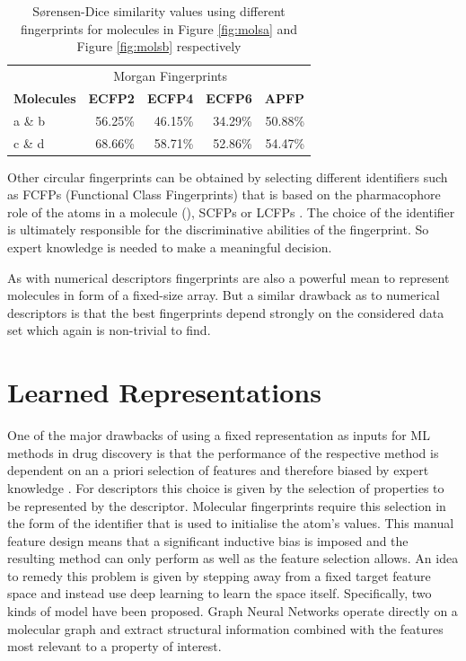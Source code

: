 \begin{table}[h]
	\centering
	\begin{tabularx}{0.57\textwidth}{l
			r
			r 
			r
			r
		}
		\toprule
		& \multicolumn{3}{c}{Morgan Fingerprints} &   \\
		\cmidrule(r){2-4} 
		\bf{Molecules}  &  \multicolumn{1}{c}{\bf{ECFP2}}   & \multicolumn{1}{c}{\bf{ECFP4}}&  \multicolumn{1}{c}{\bf{ECFP6}} & \multicolumn{1}{c}{\bf{APFP}} \\
		\midrule
		a \& b   & 56.25\%   &  46.15\%  & 34.29\%    & 50.88\%   \\
		
		c \& d   & 68.66\%  &  58.71\% &  52.86\%  & 54.47\% \\
		
		
		\bottomrule
	\end{tabularx} 
	
	
	\caption{Sørensen-Dice similarity values \cite{sorensen1948method, dice1945measures} using different fingerprints for molecules in Figure \ref{fig:molsa} and Figure \ref{fig:molsb} respectively}
	\label{tab:dis_metric_2Dshapes}
\end{table}


Other circular fingerprints can be obtained by selecting different identifiers such as FCFPs (Functional Class Fingerprints) that is based on the pharmacophore role of the atoms in a molecule (\cite{ECFP}), SCFPs \citep{SCFP} or LCFPs \citep{LCFP}. The choice of the identifier is ultimately responsible for the discriminative abilities of the fingerprint. So expert knowledge is needed to make a meaningful decision.

As with numerical descriptors fingerprints are also a powerful mean to represent molecules in form of a fixed-size array. But a similar drawback as to numerical descriptors is that the best fingerprints depend strongly on the considered data set which again is  non-trivial to find.



\section{Learned Representations}
One of the major drawbacks of using a fixed representation as inputs for ML methods in drug discovery is that the performance of the respective method is dependent on an a priori selection of features and therefore biased by expert knowledge \cite{merkwirth}. For descriptors this choice is given by the selection of properties to be represented by the descriptor. Molecular fingerprints require this selection in the form of the identifier that is used to initialise the atom's values. This manual feature design means that a significant inductive bias is imposed and the resulting method can only perform as well as the feature selection allows. An idea to remedy this problem is given by stepping away from a fixed target feature space and instead use deep learning to learn the space itself. Specifically, two kinds of model have been proposed. Graph Neural Networks operate directly on a molecular graph and extract structural information combined with the features most relevant to a property of interest.

